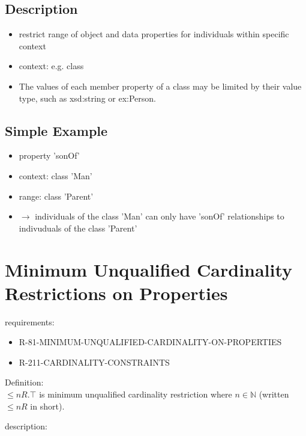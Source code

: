 \documentclass{llncs}
\begin{document}
\subsection{Description}

\begin{itemize}
  \item restrict range of object and data properties for individuals within specific context
	\item context: e.g. class
	\item The values of each member property of a class may be limited by their value type, such as xsd:string or ex:Person. 
\end{itemize}

\subsection{Simple Example}

\begin{itemize}
	\item property 'sonOf'
	\item context: class 'Man'
	\item range: class 'Parent'
	\item $\rightarrow$ individuals of the class 'Man' can only have 'sonOf' relationships to indivuduals of the class 'Parent'
\end{itemize}

\section{Minimum Unqualified Cardinality Restrictions on Properties}

requirements:

\begin{itemize}
	\item R-81-MINIMUM-UNQUALIFIED-CARDINALITY-ON-PROPERTIES
	\item R-211-CARDINALITY-CONSTRAINTS
\end{itemize}

Definition:\\

$\leq n R. \top$ is minimum unqualified cardinality restriction where $n \in \mathbb{N}$ (written $\leq  n R$ in short).

description:
\end{document}
